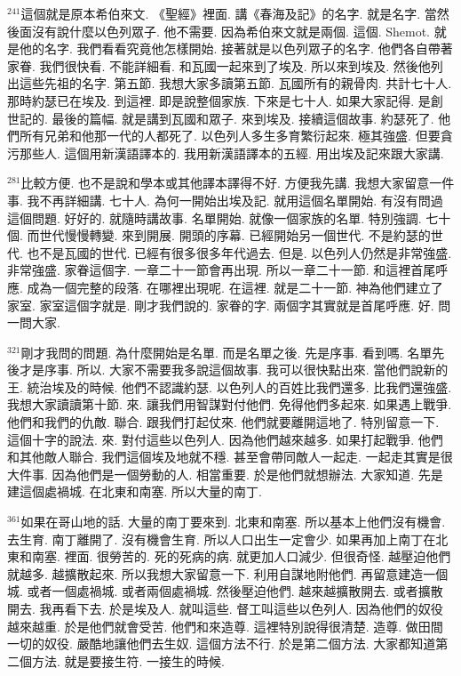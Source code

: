 \documentclass{book}
\begin{document}
$^{241}$這個就是原本希伯來文.
《聖經》裡面.
講《春海及記》的名字.
就是名字.
當然後面沒有說什麼以色列眾子.
他不需要.
因為希伯來文就是兩個.
這個.
Shemot.
就是他的名字.
我們看看究竟他怎樣開始.
接著就是以色列眾子的名字.
他們各自帶著家眷.
我們很快看.
不能詳細看.
和瓦國一起來到了埃及.
所以來到埃及.
然後他列出這些先祖的名字.
第五節.
我想大家多讀第五節.
瓦國所有的親骨肉.
共計七十人.
那時約瑟已在埃及.
到這裡.
即是說整個家族.
下來是七十人.
如果大家記得.
是創世記的.
最後的篇幅.
就是講到瓦國和眾子.
來到埃及.
接續這個故事.
約瑟死了.
他們所有兄弟和他那一代的人都死了.
以色列人多生多育繁衍起來.
極其強盛.
但要貪污那些人.
這個用新漢語譯本的.
我用新漢語譯本的五經.
用出埃及記來跟大家講.

$^{281}$比較方便.
也不是說和學本或其他譯本譯得不好.
方便我先講.
我想大家留意一件事.
我不再詳細講.
七十人.
為何一開始出埃及記.
就用這個名單開始.
有沒有問過這個問題.
好好的.
就隨時講故事.
名單開始.
就像一個家族的名單.
特別強調.
七十個.
而世代慢慢轉變.
來到開展.
開頭的序幕.
已經開始另一個世代.
不是約瑟的世代.
也不是瓦國的世代.
已經有很多很多年代過去.
但是.
以色列人仍然是非常強盛.
非常強盛.
家眷這個字.
一章二十一節會再出現.
所以一章二十一節.
和這裡首尾呼應.
成為一個完整的段落.
在哪裡出現呢.
在這裡.
就是二十一節.
神為他們建立了家室.
家室這個字就是.
剛才我們說的.
家眷的字.
兩個字其實就是首尾呼應.
好.
問一問大家.

$^{321}$剛才我問的問題.
為什麼開始是名單.
而是名單之後.
先是序事.
看到嗎.
名單先後才是序事.
所以.
大家不需要我多說這個故事.
我可以很快點出來.
當他們說新的王.
統治埃及的時候.
他們不認識約瑟.
以色列人的百姓比我們還多.
比我們還強盛.
我想大家讀讀第十節.
來.
讓我們用智謀對付他們.
免得他們多起來.
如果遇上戰爭.
他們和我們的仇敵.
聯合.
跟我們打起仗來.
他們就要離開這地了.
特別留意一下.
這個十字的說法.
來.
對付這些以色列人.
因為他們越來越多.
如果打起戰爭.
他們和其他敵人聯合.
我們這個埃及地就不穩.
甚至會帶同敵人一起走.
一起走其實是很大件事.
因為他們是一個勞動的人.
相當重要.
於是他們就想辦法.
大家知道.
先是建這個處禍城.
在北東和南塞.
所以大量的南丁.

$^{361}$如果在哥山地的話.
大量的南丁要來到.
北東和南塞.
所以基本上他們沒有機會.
去生育.
南丁離開了.
沒有機會生育.
所以人口出生一定會少.
如果再加上南丁在北東和南塞.
裡面.
很勞苦的.
死的死病的病.
就更加人口減少.
但很奇怪.
越壓迫他們就越多.
越擴散起來.
所以我想大家留意一下.
利用自謀地附他們.
再留意建造一個城.
或者一個處禍城.
或者兩個處禍城.
然後壓迫他們.
越來越擴散開去.
或者擴散開去.
我再看下去.
於是埃及人.
就叫這些.
督工叫這些以色列人.
因為他們的奴役越來越重.
於是他們就會受苦.
他們和來造尊.
這裡特別說得很清楚.
造尊.
做田間一切的奴役.
嚴酷地讓他們去生奴.
這個方法不行.
於是第二個方法.
大家都知道第二個方法.
就是要接生符.
一接生的時候.
\end{document}

